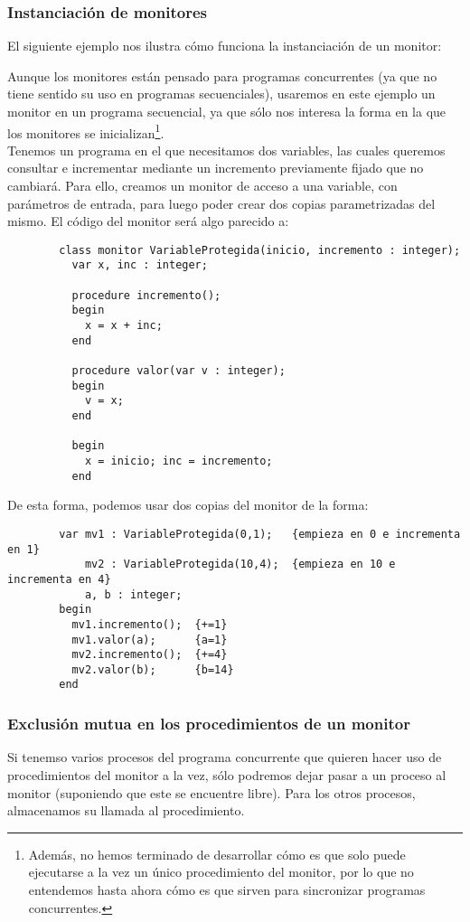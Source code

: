 \subsubsection{Instanciación de monitores}
El siguiente ejemplo nos ilustra cómo funciona la instanciación de un monitor:

\begin{ejemplo}
    Aunque los monitores están pensado para programas concurrentes (ya que no tiene sentido su uso en programas secuenciales), usaremos en este ejemplo un monitor en un programa secuencial, ya que sólo nos interesa la forma en la que los monitores se inicializan\footnote{Además, no hemos terminado de desarrollar cómo es que solo puede ejecutarse a la vez un único procedimiento del monitor, por lo que no entendemos hasta ahora cómo es que sirven para sincronizar programas concurrentes.}.\\

    Tenemos un programa en el que necesitamos dos variables, las cuales queremos consultar e incrementar mediante un incremento previamente fijado que no cambiará. Para ello, creamos un monitor de acceso a una variable, con parámetros de entrada, para luego poder crear dos copias parametrizadas del mismo. El código del monitor será algo parecido a:
    \begin{verbatim}
        class monitor VariableProtegida(inicio, incremento : integer);
          var x, inc : integer;

          procedure incremento();
          begin
            x = x + inc;
          end

          procedure valor(var v : integer);
          begin
            v = x;
          end
          
          begin
            x = inicio; inc = incremento;
          end
    \end{verbatim}
    De esta forma, podemos usar dos copias del monitor de la forma:
    \begin{verbatim}
        var mv1 : VariableProtegida(0,1);   {empieza en 0 e incrementa en 1}
            mv2 : VariableProtegida(10,4);  {empieza en 10 e incrementa en 4}
            a, b : integer;
        begin
          mv1.incremento();  {+=1}
          mv1.valor(a);      {a=1}
          mv2.incremento();  {+=4}
          mv2.valor(b);      {b=14}
        end
    \end{verbatim}
\end{ejemplo}

\subsubsection{Exclusión mutua en los procedimientos de un monitor}
Si tenemso varios procesos del programa concurrente que quieren hacer uso de procedimientos del monitor a la vez, sólo podremos dejar pasar a un proceso al monitor (suponiendo que este se encuentre libre). Para los otros procesos, almacenamos su llamada al procedimiento. 

